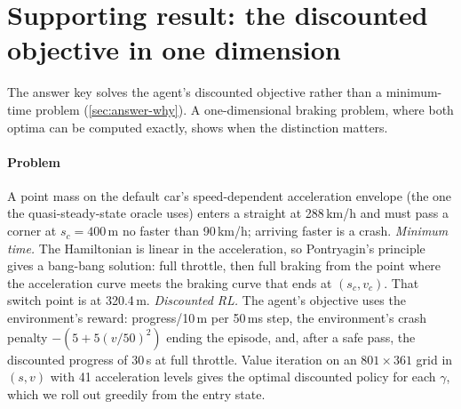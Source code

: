 \section{Supporting result: the discounted objective in one dimension}
\label{app:braking}

The answer key solves the agent's discounted objective rather than a minimum-time problem
(\cref{sec:answer-why}). A one-dimensional braking problem, where both optima can be
computed exactly, shows when the distinction matters.

\paragraph{Problem} A point mass on the default car's speed-dependent acceleration envelope
(the one the quasi-steady-state oracle uses) enters a straight at 288\,km/h and must pass
a corner at $s_c = 400$\,m no faster than 90\,km/h; arriving faster is a crash.
\emph{Minimum time.} The Hamiltonian is linear in the acceleration, so Pontryagin's
principle gives a bang-bang solution: full throttle, then full braking from the point where
the acceleration curve meets the braking curve that ends at $(s_c, v_c)$. That switch
point is at 320.4\,m.
\emph{Discounted RL.} The agent's objective uses the environment's reward: progress/10\,m
per 50\,ms step, the environment's crash penalty $-(5 + 5(v/50)^2)$ ending the episode, and,
after a safe pass, the discounted progress of 30\,s at full throttle. Value iteration on
an $801 \times 361$ grid in $(s, v)$ with 41 acceleration levels gives the optimal
discounted policy for each $\gamma$, which we roll out greedily from the entry state.

